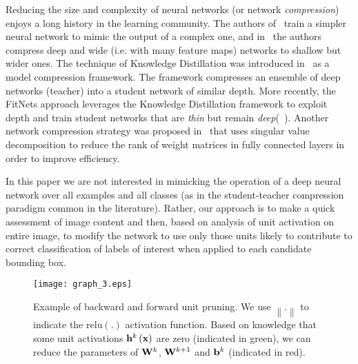 \documentclass{article}
\begin{document}
Reducing the size and complexity of neural networks (or network
\emph{compression}) enjoys a long history in the learning community.
The authors of~\cite{bucila2006model} train a simpler neural network
to mimic the output of a complex one, and in~\cite{ba2014deep} the
authors compress deep and wide (i.e. with many feature maps) networks
to shallow but wider ones. The technique of Knowledge Distillation was
introduced in~\cite{hinton2015distilling} as a model compression
framework. The framework compresses an ensemble of deep networks
(teacher) into a student network of similar depth. More recently, the
FitNets approach leverages the Knowledge Distillation framework to
exploit depth and train student networks that are \emph{thin} but
remain \emph{deep}(~\cite{AdrianaFitNets:2014}). Another network
compression strategy was proposed in~\cite{girshick2015fast,xue2013restructuring} that uses
singular value decomposition to reduce the rank of weight matrices in
fully connected layers in order to improve efficiency.

In this paper we are not interested in mimicking the operation of a
deep neural network over all examples and all classes (as in the
student-teacher compression paradigm common in the
literature). Rather, our approach is to make a quick assessment of
image content and then, based on analysis of unit activation on entire
image, to modify the network to use only those units likely to
contribute to correct classification of labels of interest when
applied to each candidate bounding box.

\begin{wrapfigure}{r}{0.5\textwidth}
  \begin{center}
    \texttt{[image: graph\_3.eps]}
  \end{center}
  \caption{Example of backward and forward unit pruning. We use $\left\| . \right\|$ to indicate the $\mathrm{relu}\left(.\right)$ activation function. Based on knowledge that some unit activations ${\bf{h}}^k \left( {\bf{x}} \right)$ are zero (indicated in green), we can reduce the parameters of ${\bf{W}}^k$, ${\bf{W}}^{k + 1}$ and ${\bf{b}}^k$ (indicated in red).}\label{fig:pruning}
\end{wrapfigure}
\end{document}
